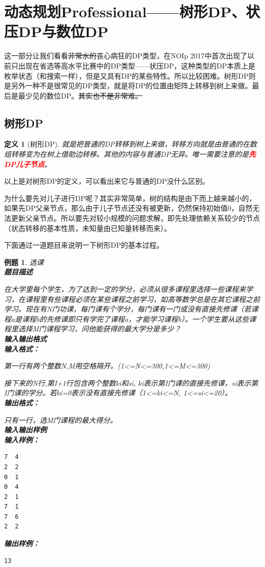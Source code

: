 \documentclass{article}
\newtheorem{example}{例题}[subsection]
\newtheorem{definition}{定义}[subsection]
\theoremstyle{nonumberplain}
\begin{document}
\section{动态规划Professional------树形DP、状压DP与数位DP}
这一部分让我们看看\sout{非常水的}丧心病狂的DP类型，在NOIp 2017中首次出现了以前只出现在省选等高水平比赛中的DP类型------状压DP，这种类型的DP本质上是枚举状态（和搜索一样），但是又具有DP的某些特性。所以比较困难。树形DP则是另外一种不是很常见的DP类型，就是将DP的位置由矩阵上转移到树上来做。最后是最少见的数位DP。\sout{其实也不是非常难。}
\subsection{树形DP}
\begin{definition}[树形DP]就是把普通的DP转移到树上来做，转移方向就是由普通的在数组转移变为在树上借助边转移。其他的内容与普通DP无异。唯一需要注意的是\textcolor{red}{\textbf{先DP儿子节点}}。
\end{definition}

以上是对树形DP的定义，可以看出来它与普通的DP没什么区别。

为什么要先对儿子进行DP呢？其实非常简单，树的结构是由下而上越来越小的，如果先DP父亲节点，那么由于儿子节点还没有被更新，仍然保持初始值0，自然无法更新父亲节点。所以要先对较小规模的问题求解，即先处理依赖关系较少的节点（状态转移的基本性质，未知量由已知量转移而来）。

下面通过一道题目来说明一下树形DP的基本过程。
\begin{example}选课\\
	\textbf{题目描述}

	在大学里每个学生，为了达到一定的学分，必须从很多课程里选择一些课程来学习，在课程里有些课程必须在某些课程之前学习，如高等数学总是在其它课程之前学习。现在有N门功课，每门课有个学分，每门课有一门或没有直接先修课（若课程a是课程b的先修课即只有学完了课程a，才能学习课程b）。一个学生要从这些课程里选择M门课程学习，问他能获得的最大学分是多少？
	\ \\
	\textbf{输入输出格式}
	\ \\
	\textbf{输入格式：}

	第一行有两个整数N,M用空格隔开。(1<=N<=300,1<=M<=300)

	接下来的N行,第I+1行包含两个整数ki和si, ki表示第I门课的直接先修课，si表示第I门课的学分。若ki=0表示没有直接先修课（1<=ki<=N, 1<=si<=20）。
	\\
	\textbf{输出格式：}

	只有一行，选M门课程的最大得分。
	\\
	\textbf{输入输出样例}
	\\
	\textbf{输入样例：}
	\begin{verbatim}
7  4
2  2
0  1
0  4
2  1
7  1
7  6
2  2
\end{verbatim}
	\textbf{输出样例：}
	\begin{verbatim}
13
\end{verbatim}
\end{example}
\end{document}
